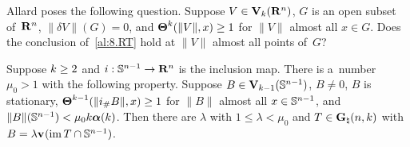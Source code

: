 \begin{remark}
    \label{al:8.1(4)}
    Allard poses the following question. Suppose $V \in \mathbf{V}_{k}(\mathbf{R}^{n})$, $G$ is an open
    subset of~$\mathbf{R}^{n}$, $\|\delta V\|(G) = 0$, and $\boldsymbol{\Theta}^{k}(\|V\|,x) \ge 1$ for $\|V\|$
    almost all $x \in G$. Does the conclusion of~\ref{al:8.RT} hold at $\|V\|$ almost all points
    of~$G$?
\end{remark}

\begin{corollary}
    \label{al:8.1(5)}
    Suppose $k \ge 2$ and $i : \mathbb{S}^{n-1} \to \mathbf{R}^{n}$ is the inclusion map. There is
    a~number $\mu_0 > 1$ with the following property. Suppose $B \in
    \mathbf{V}_{k-1}(\mathbb{S}^{n-1})$, $B \ne 0$, $B$ is stationary, $\boldsymbol{\Theta}^{k-1}(\|i_\#
    B\|,x) \ge 1$ for $\|B\|$ almost all $x \in \mathbb{S}^{n-1}$, and $\|B\|(\mathbb{S}^{n-1}) <
    \mu_0 k \boldsymbol{\alpha}(k)$. Then there are $\lambda$ with $1 \le \lambda < \mu_0$ and $T \in
    \mathbf{G}_{\natural}(n,k)$ with $B = \lambda \mathbf{v}_{}(\operatorname{im} T \cap \mathbb{S}^{n-1})$.
\end{corollary}

